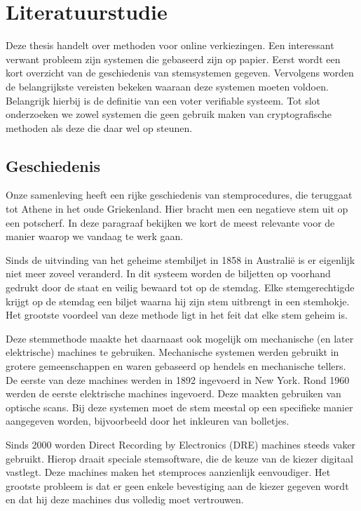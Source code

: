 % 
%

\chapter{Literatuurstudie}
\label{chap:literatuurstudie}

Deze thesis handelt over methoden voor online verkiezingen. Een interessant verwant probleem zijn systemen die gebaseerd zijn op papier. Eerst wordt een kort overzicht van de geschiedenis van stemsystemen gegeven. Vervolgens worden de belangrijkste vereisten bekeken waaraan deze systemen moeten voldoen. Belangrijk hierbij is de definitie van een voter verifiable systeem. Tot slot onderzoeken we zowel systemen die geen gebruik maken van cryptografische methoden als deze die daar wel op steunen.

\section{Geschiedenis}

Onze samenleving heeft een rijke geschiedenis van stemprocedures, die teruggaat tot Athene in het oude Griekenland. Hier bracht men een negatieve stem uit op een potscherf. In deze paragraaf bekijken we kort de meest relevante voor de manier waarop we vandaag te werk gaan.

\npar Sinds de uitvinding van het geheime stembiljet in 1858 in Australi\"e is er eigenlijk niet meer zoveel veranderd. In dit systeem worden de biljetten op voorhand gedrukt door de staat en veilig bewaard tot op de stemdag. Elke stemgerechtigde krijgt op de stemdag een biljet waarna hij zijn stem uitbrengt in een stemhokje. Het grootste voordeel van deze methode ligt in het feit dat elke stem geheim is.

\npar Deze stemmethode maakte het daarnaast ook mogelijk om mechanische (en later elektrische) machines te gebruiken. Mechanische systemen werden gebruikt in grotere gemeenschappen en waren gebaseerd op hendels en mechanische tellers. De eerste van deze machines werden in 1892 ingevoerd in New York. Rond 1960 werden de eerste elektrische machines ingevoerd. Deze maakten gebruiken van optische scans. Bij deze systemen moet de stem meestal op een specifieke manier aangegeven worden, bijvoorbeeld door het inkleuren van bolletjes.

\npar Sinds 2000 worden Direct Recording by Electronics (DRE) machines steeds vaker gebruikt. Hierop draait speciale stemsoftware, die de keuze van de kiezer digitaal vastlegt. Deze machines maken het stemproces aanzienlijk eenvoudiger. Het grootste probleem is dat er geen enkele bevestiging aan de kiezer gegeven wordt en dat hij deze machines dus volledig moet vertrouwen.

